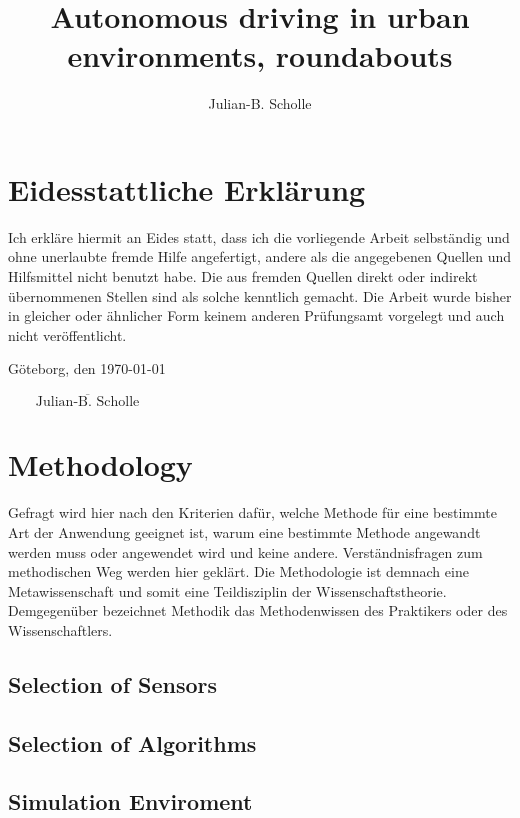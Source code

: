 \documentclass[11pt,oneside,openright]{mpreport}
\title{Autonomous driving in urban environments, roundabouts}
\author{Julian-B. Scholle}
\begin{document}
\maketitle

\tableofcontents

\chapter*{Eidesstattliche Erklärung}
Ich erkläre hiermit an Eides statt, dass ich die vorliegende Arbeit selbständig und
ohne unerlaubte fremde Hilfe angefertigt, andere als die angegebenen Quellen und
Hilfsmittel nicht benutzt habe. Die aus fremden Quellen direkt oder indirekt
übernommenen Stellen sind als solche kenntlich gemacht.
Die Arbeit wurde bisher in gleicher oder ähnlicher Form keinem anderen
Prüfungsamt vorgelegt und auch nicht veröffentlicht.

\noindent Göteborg, den \today
\begin{flushright}
$\overline{~~~~~~~~~\mbox{Julian-B. Scholle}~~~~~~~~~}$
\end{flushright}




\chapter{Methodology}
Gefragt wird hier nach den Kriterien dafür, welche Methode für eine bestimmte Art der Anwendung geeignet ist, warum eine bestimmte Methode angewandt werden muss oder angewendet wird und keine andere. Verständnisfragen zum methodischen Weg werden hier geklärt. Die Methodologie ist demnach eine Metawissenschaft und somit eine Teildisziplin der Wissenschaftstheorie. Demgegenüber bezeichnet Methodik das Methodenwissen des Praktikers oder des Wissenschaftlers.

\section{Selection of Sensors}
\section{Selection of Algorithms}
\section{Simulation Enviroment}
\end{document}
